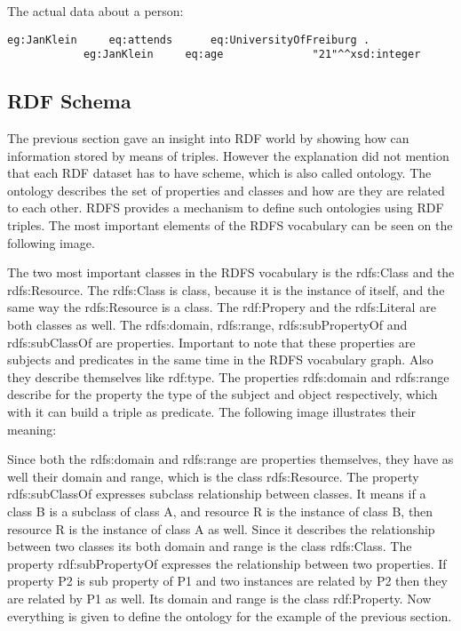 The actual data about a person:

\begin{lstlisting}[basicstyle=\footnotesize, captionpos=b, caption=Example prefix, label=lst:sparql, belowskip=1em, aboveskip=2em,
frame=single]
			eg:JanKlein		eq:attends		eq:UniversityOfFreiburg .
			eg:JanKlein		eq:age				"21"^^xsd:integer 
\end{lstlisting}


\subsection{RDF Schema}


The previous section gave an insight into RDF world by showing how can information stored by means of triples. However the explanation did not mention that each RDF dataset has to have scheme, which is also called ontology. The ontology describes the set of properties and classes and how are they are related to each other. RDFS provides a mechanism to define such ontologies using RDF triples. The most important elements of the RDFS vocabulary can be seen on the following image. 


The two most important classes in the RDFS vocabulary is the rdfs:Class and the rdfs:Resource. The rdfs:Class is class, because it is the instance of itself, and the same way the rdfs:Resource is a class. The rdf:Propery and the rdfs:Literal are both classes as well. The rdfs:domain, rdfs:range, rdfs:subPropertyOf and rdfs:subClassOf are properties. Important to note that these properties are subjects and predicates in the same time in the RDFS vocabulary graph. Also they describe themselves like rdf:type.
The properties rdfs:domain and rdfs:range describe for the property the type of the subject and object respectively, which with it can build a triple as predicate. The following image illustrates their meaning:


Since both the rdfs:domain and rdfs:range are properties themselves, they have as well their domain and range, which is the class rdfs:Resource. 
The property rdfs:subClassOf expresses subclass relationship between classes. It means if a class B is a subclass of class A, and resource R is the instance of class B, then resource R is the instance of class A as well. Since it describes the relationship between two classes its both domain and range is the class rdfs:Class. 
The property rdf:subPropertyOf expresses the relationship between two properties. If property P2 is sub property of P1 and two instances are related by P2 then they are related by P1 as well. Its domain and range is the class  rdf:Property.
Now everything is given to define the ontology for the example of the previous section. \cite{Brickley:04:RVD}

